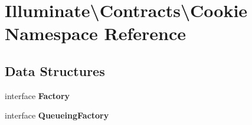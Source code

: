 \section{Illuminate\textbackslash{}Contracts\textbackslash{}Cookie Namespace Reference}
\label{namespace_illuminate_1_1_contracts_1_1_cookie}
\subsection*{Data Structures}
\begin{DoxyCompactItemize}
\item 
interface {\bf Factory}
\item 
interface {\bf Queueing\+Factory}
\end{DoxyCompactItemize}
